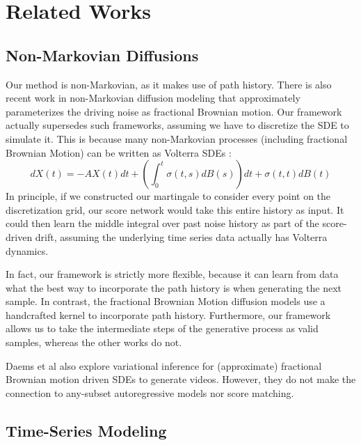 \section{Related Works}\label{sec:related_work}

\subsection{Non-Markovian Diffusions}

Our method is non-Markovian, as it makes use of path history. There is also recent work in non-Markovian diffusion modeling \cite{nobis2024generative, nobis2025fractional} that approximately parameterizes the driving noise as fractional Brownian motion. Our framework actually supersedes such frameworks, assuming we have to discretize the SDE to simulate it. This is because many non-Markovian processes (including fractional Brownian Motion) can be written as Volterra SDEs \cite{burton2005volterra}:
\begin{equation}\label{eqn:volterra}
    dX(t) = -AX(t)dt + \left(\int_{0}^{t}\sigma(t, s)dB(s)\right) dt + \sigma(t, t)dB(t)
\end{equation}
In principle, if we constructed our martingale to consider every point on the discretization grid, our score network would take this entire history as input. It could then learn the middle integral over past noise history as part of the score-driven drift, assuming the underlying time series data actually has Volterra dynamics.

In fact, our framework is strictly more flexible, because it can learn from data what the best way to incorporate the path history is when generating the next sample. In contrast, the fractional Brownian Motion diffusion models use a handcrafted kernel to incorporate path history.
Furthermore, our framework allows us to take the intermediate steps of the generative process as valid samples, whereas the other works do not.

Daems et al \cite{daems2023variational} also explore variational inference for (approximate) fractional Brownian motion driven SDEs to generate videos. However, they do not make the connection to any-subset autoregressive models nor score matching.

\subsection{Time-Series Modeling}
